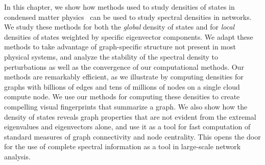 In this chapter, we show how methods used to study densities of states in
condensed matter physics~\cite{weisse2006kernel} can be used to study spectral
densities in networks.  We study these methods for both the {\em global} density
of states and for {\em local} densities of states weighted by specific
eigenvector components. We adapt these methods to take advantage of
graph-specific structure not present in most physical systems, and analyze the
stability of the spectral density to perturbations as well as the convergence of
our computational methods.  Our methods are remarkably efficient, as we
illustrate by computing densities for graphs with billions of edges and tens of
millions of nodes on a single cloud compute node. We use our methods for
computing these densities to create compelling visual fingerprints that
summarize a graph. We also show how the density of states reveals graph
properties that are not evident from the extremal eigenvalues and eigenvectors
alone, and use it as a tool for fast computation of standard measures of graph
connectivity and node centrality. This opens the door for the use of complete
spectral information as a tool in large-scale network analysis.